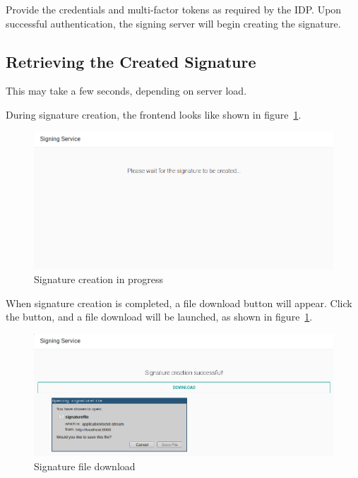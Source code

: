 Provide the credentials and multi-factor tokens as required by the \gls{IDP}.
Upon successful authentication,
the signing server will begin creating the signature.

\subsection{Retrieving the Created Signature}\label{subsec:retrieving-the-created-signature}
This may take a few seconds, depending on server load.

During signature creation, the frontend looks like shown in figure~\ref{fig:userguide6}.

\begin{figure}[H]
    \begin{center}
        \includegraphics[width=\linewidth]{images/userguide_sign_6.png}
    \end{center}
    \caption{Signature creation in progress}
    \label{fig:userguide6}
\end{figure}

When signature creation is completed,
a file download button will appear.
Click the button,
and a file download will be launched,
as shown in figure~\ref{fig:userguide6}.


\begin{figure}[H]
    \begin{center}
        \includegraphics[width=\linewidth]{images/userguide_sign_7.png}
    \end{center}
    \caption{Signature file download}
    \label{fig:userguide7}
\end{figure}

